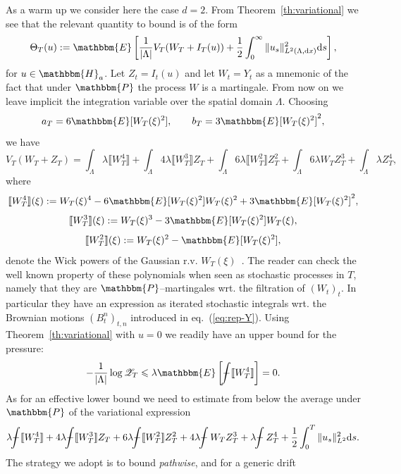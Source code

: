 \documentclass[11pt, oneside]{article}   	%
\newcommand{\assign}{:=}
\newcommand{\mathd}{\mathrm{d}}
\newcommand{\tmtextit}[1]{{\itshape{#1}}}
\def\Xint#1{\mathchoice
{\XXint\displaystyle\textstyle{#1}}%
{\XXint\textstyle\scriptstyle{#1}}%
{\XXint\scriptstyle\scriptscriptstyle{#1}}%
{\XXint\scriptscriptstyle\scriptscriptstyle{#1}}%
\!\int}
\def\XXint#1#2#3{{\setbox0=\hbox{$#1{#2#3}{\int}$ }
\vcenter{\hbox{$#2#3$ }}\kern-.6\wd0}}
\def\dashint{\Xint-}
\newcommand{\bint}{\dashint}
\newcommand{\CZ}{\mathscr{Z}}
\begin{document}
As a warm up we consider here the case $d = 2$. From
Theorem~\ref{th:variational} we see that the relevant quantity to bound is of
the form
\begin{equation}
  \Theta_T (u) \assign \mathbbm{E} \left[ \frac{1}{| \Lambda |} V_T (W_T + I_T
  (u)) + \frac{1}{2} \int_0^{\infty} \| u_s \|_{L^2 (\Lambda, \mathd x)}^2
  \mathd s \right], \label{eq:var-energy}
\end{equation}
for $u \in \mathbbm{H}_a$. Let $Z_t = I_t (u)$ and let $W_t = Y_t$ as a
mnemonic of the fact that under $\mathbbm{P}$ the process $W$ is a martingale.
From now on we leave implicit the integration variable over the spatial domain
$\Lambda$. Choosing
\begin{equation}
  a_T = 6\mathbbm{E} [W_T (\xi)^2], \qquad b_T = 3\mathbbm{E} [W_T (\xi)^2]^2,
  \label{eq:renorm-const-2d}
\end{equation}
we have
\[ V_T (W_T + Z_T) = \int_{\Lambda} \lambda \llbracket W_T^4 \rrbracket +
   \int_{\Lambda} 4 \lambda \llbracket W_T^3 \rrbracket Z_T + \int_{\Lambda} 6
   \lambda \llbracket W_T^2 \rrbracket Z_T^2 + \int_{\Lambda} 6 \lambda W_T
   Z_T^3 + \int_{\Lambda} \lambda Z_T^4, \]
where
\[ \llbracket W_T^4 \rrbracket (\xi) \assign W_T (\xi)^4 - 6\mathbbm{E} [W_T
   (\xi)^2] W_T (\xi)^2 + 3\mathbbm{E} [W_T (\xi)^2]^2, \]
\[ \llbracket W_T^3 \rrbracket (\xi) \assign W_T (\xi)^3 - 3\mathbbm{E} [W_T
   (\xi)^2] W_T (\xi), \]
\[ \llbracket W_T^2 \rrbracket (\xi) \assign W_T (\xi)^2 -\mathbbm{E} [W_T
   (\xi)^2], \]
denote the Wick powers of the Gaussian r.v. $W_T
(\xi)$~{\cite{janson_gaussian_1997}}. The reader can check the well known
property of these polynomials when seen as stochastic processes in $T$, namely
that they are $\mathbbm{P}$--martingales wrt. the filtration of $(W_t)_t$. In
particular they have an expression as iterated stochastic integrals wrt. the
Brownian motions $(B^n_t)_{t, n}$ introduced in eq.~(\ref{eq:rep-Y}). Using
Theorem~\ref{th:variational} with $u = 0$ we readily have an upper bound for
the pressure:
\[ - \frac{1}{| \Lambda |} \log \CZ_T \leqslant \lambda \mathbbm{E} \left[
   \bint \llbracket W_T^4 \rrbracket \right] = 0. \]
As for an effective lower bound we need to estimate from below the average
under $\mathbbm{P}$ of the variational expression
\[ \lambda \bint \llbracket W_T^4 \rrbracket + 4 \lambda \bint \llbracket
   W_T^3 \rrbracket Z_T + 6 \lambda \bint \llbracket W_T^2 \rrbracket Z_T^2 +
   4 \lambda \bint W_T Z_T^3 + \lambda \bint  Z_T^4 + \frac{1}{2} \int_0^T
   \| u_s \|^2_{L^2} \mathd s. \]
The strategy we adopt is to bound \tmtextit{pathwise}, and for a generic drift
\end{document}
